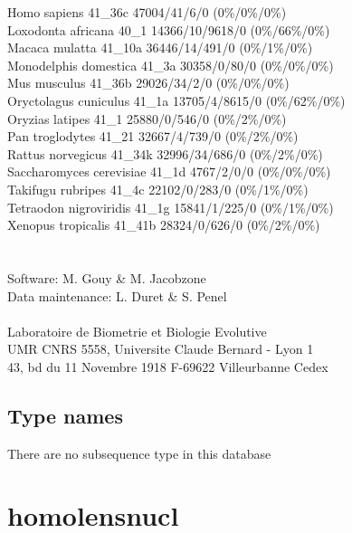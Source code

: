 \documentclass{article}
\begin{document}
\begin{Schunk}
Homo sapiens                            41\_36c 47004/41/6/0 (0\%/0\%/0\%)\\
Loxodonta africana                      40\_1 14366/10/9618/0 (0\%/66\%/0\%)\\
Macaca mulatta                          41\_10a 36446/14/491/0 (0\%/1\%/0\%)\\
Monodelphis domestica                   41\_3a 30358/0/80/0 (0\%/0\%/0\%)\\
Mus musculus                            41\_36b 29026/34/2/0 (0\%/0\%/0\%)\\
Oryctolagus cuniculus                   41\_1a 13705/4/8615/0 (0\%/62\%/0\%)\\
Oryzias latipes                         41\_1 25880/0/546/0 (0\%/2\%/0\%)\\
Pan troglodytes                         41\_21 32667/4/739/0 (0\%/2\%/0\%)\\
Rattus norvegicus                       41\_34k 32996/34/686/0 (0\%/2\%/0\%)\\
Saccharomyces cerevisiae                41\_1d 4767/2/0/0 (0\%/0\%/0\%)\\
Takifugu rubripes                       41\_4c 22102/0/283/0 (0\%/1\%/0\%)\\
Tetraodon nigroviridis                  41\_1g 15841/1/225/0 (0\%/1\%/0\%)\\
Xenopus tropicalis                      41\_41b 28324/0/626/0 (0\%/2\%/0\%)\\
\\
\\
Software: M. Gouy \& M. Jacobzone\\
Data maintenance: L. Duret \& S. Penel\\
\\
Laboratoire de Biometrie et Biologie Evolutive\\
UMR CNRS 5558, Universite Claude Bernard - Lyon 1\\
43, bd du 11 Novembre 1918 F-69622 Villeurbanne Cedex\\


\subsection{Type names}
There are no subsequence type in this database
\section{ homolensnucl }

\end{Schunk}
\end{document}
